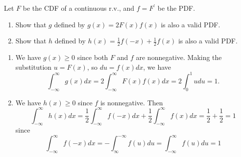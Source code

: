 

\setcounter{theorem}{2}
\begin{exercise}[BH.5.3] Let $F$ be the CDF of a continuous r.v., and $f=F^{\prime}$ be the PDF.
    \begin{enumerate}
        \item  Show that $g$ defined by $g(x)=2 F(x) f(x)$ is also a valid PDF.
        \item   Show that $h$ defined by $h(x)=\frac{1}{2} f(-x)+\frac{1}{2} f(x)$ is also a valid PDF.
    \end{enumerate}
\begin{solution}
    \begin{enumerate}
        \item We have $g(x) \geq 0$ since both $F$ and $f$ are nonnegative. Making the substitution $u=F(x)$, so $d u=f(x) d x$, we have
        $$
        \int_{-\infty}^{\infty} g(x) d x=2 \int_{-\infty}^{\infty} F(x) f(x) d x=2 \int_0^1 u d u=1.
        $$
        \item  We have $h(x) \geq 0$ since $f$ is nonnegative. Then
        $$
        \int_{-\infty}^{\infty} h(x) d x=\frac{1}{2} \int_{-\infty}^{\infty} f(-x) d x+\frac{1}{2} \int_{-\infty}^{\infty} f(x) d x=\frac{1}{2}+\frac{1}{2}=1
        $$
        since
        $$
        \int_{-\infty}^{\infty} f(-x) d x=-\int_{\infty}^{-\infty} f(u) d u=\int_{-\infty}^{\infty} f(u) d u=1
        $$
    \end{enumerate}
\end{solution}
\end{exercise}


